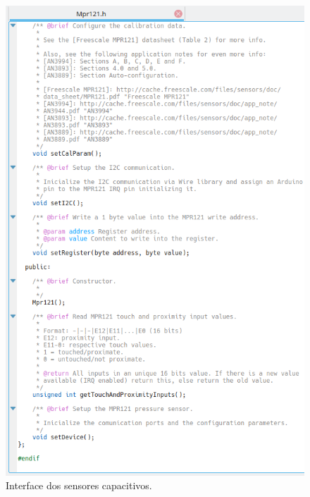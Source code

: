    \begin{figure}[htbp]
    \centering
    \includegraphics[scale=0.8,keepaspectratio=true]{./imagenes/interface-sensores-capacitivos.png}
    \caption{Interface dos sensores capacitivos.}
    \label{figura:InterfaceSensoresCapacitivos}
   \end{figure}
   
